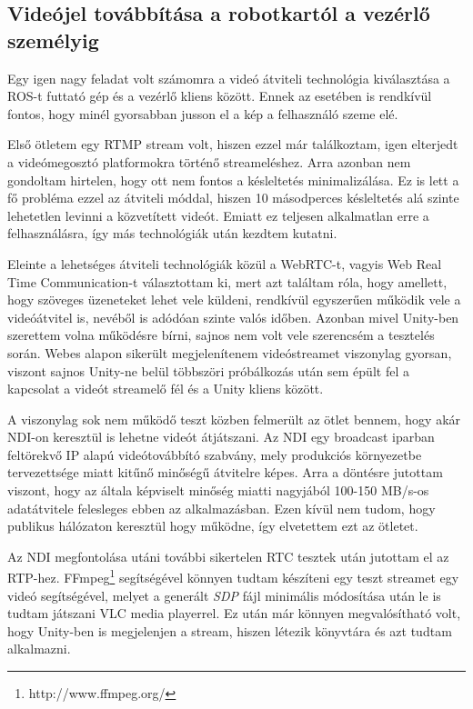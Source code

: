 \documentclass[11pt,a4paper,oneside]{article}
\begin{document}
\subsection{Videójel továbbítása a robotkartól a vezérlő személyig}

Egy igen nagy feladat volt számomra a videó átviteli technológia kiválasztása a ROS-t futtató gép és a vezérlő kliens között. Ennek az esetében is rendkívül fontos, hogy minél gyorsabban jusson el a kép a felhasználó szeme elé.

Első ötletem egy RTMP stream volt, hiszen ezzel már találkoztam, igen elterjedt a videómegosztó platformokra történő streameléshez. Arra azonban nem gondoltam hirtelen, hogy ott nem fontos a késleltetés minimalizálása. Ez is lett a fő probléma ezzel az átviteli móddal, hiszen 10 másodperces késleltetés alá szinte lehetetlen levinni a közvetített videót. Emiatt ez teljesen alkalmatlan erre a felhasználásra, így más technológiák után kezdtem kutatni.

Eleinte a lehetséges átviteli technológiák közül a WebRTC-t, vagyis Web Real Time Communication-t választottam ki, mert azt találtam róla, hogy amellett, hogy szöveges üzeneteket lehet vele küldeni, rendkívül egyszerűen működik vele a videóátvitel is, nevéből is adódóan szinte valós időben. Azonban mivel Unity-ben szerettem volna működésre bírni, sajnos nem volt vele szerencsém a tesztelés során. Webes alapon sikerült megjelenítenem videóstreamet viszonylag gyorsan, viszont sajnos Unity-ne belül többszöri próbálkozás után sem épült fel a kapcsolat a videót streamelő fél és a Unity kliens között.

A viszonylag sok nem működő teszt közben felmerült az ötlet bennem, hogy akár NDI-on keresztül is lehetne videót átjátszani. Az NDI egy broadcast iparban feltörekvő IP alapú videótovábbító szabvány, mely produkciós környezetbe tervezettsége miatt kitűnő minőségű átvitelre képes. Arra a döntésre jutottam viszont, hogy az általa képviselt minőség miatti nagyjából 100-150 MB/s-os adatátvitele felesleges ebben az alkalmazásban. Ezen kívül nem tudom, hogy publikus hálózaton keresztül hogy működne, így elvetettem ezt az ötletet.

Az NDI megfontolása utáni további sikertelen RTC tesztek után jutottam el az RTP-hez. FFmpeg\footnote{http://www.ffmpeg.org/} segítségével könnyen tudtam készíteni egy teszt streamet egy videó segítségével, melyet a generált \textit{SDP} fájl minimális módosítása után le is tudtam játszani VLC media playerrel. Ez után már könnyen megvalósítható volt, hogy Unity-ben is megjelenjen a stream, hiszen létezik könyvtára és azt tudtam alkalmazni.
\end{document}
